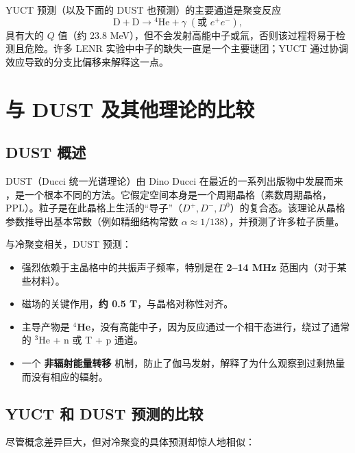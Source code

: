 \documentclass[12pt]{article}
\theoremstyle{remark}
\begin{document}
	YUCT 预测（以及下面的 DUST 也预测）的主要通道是聚变反应
	\[
	\mathrm{D} + \mathrm{D} \to {}^4\mathrm{He} + \gamma\;(\text{或 } e^+e^-),
	\]
	具有大的 \(Q\) 值（约 23.8 MeV），但不会发射高能中子或氚，否则该过程将易于检测且危险。许多 LENR 实验中中子的缺失一直是一个主要谜团；YUCT 通过协调效应导致的分支比偏移来解释这一点。
	
	\section{与 DUST 及其他理论的比较}
	\label{sec:comparison}
	
	\subsection{DUST 概述}
	
	DUST（Ducci 统一光谱理论）由 Dino Ducci 在最近的一系列出版物中发展而来 \cite{Ducci2025,Ducci2026a,Ducci2026b}，是一个根本不同的方法。它假定空间本身是一个周期晶格（素数周期晶格，PPL）。粒子是在此晶格上生活的“导子”（\(D^+, D^-, D^0\)）的复合态。该理论从晶格参数推导出基本常数（例如精细结构常数 \(\alpha \approx 1/138\)），并预测了许多粒子质量。
	
	与冷聚变相关，DUST 预测：
	\begin{itemize}
		\item 强烈依赖于主晶格中的共振声子频率，特别是在 \textbf{2–14 MHz} 范围内（对于某些材料）。
		\item 磁场的关键作用，\textbf{约 0.5 T}，与晶格对称性对齐。
		\item 主导产物是 \textbf{\(^4\)He}，没有高能中子，因为反应通过一个相干态进行，绕过了通常的 \(^3\)He + n 或 T + p 通道。
		\item 一个 \textbf{非辐射能量转移} 机制，防止了伽马发射，解释了为什么观察到过剩热量而没有相应的辐射。
	\end{itemize}
	
	\subsection{YUCT 和 DUST 预测的比较}
	
	尽管概念差异巨大，但对冷聚变的具体预测却惊人地相似：
	
\end{document}
